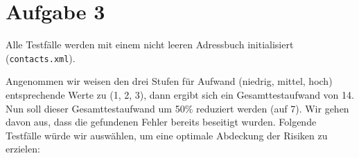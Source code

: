 \section{Aufgabe 3}
Alle Testfälle werden mit einem nicht leeren Adressbuch initialisiert (\texttt{contacts.xml}).

Angenommen wir weisen den drei Stufen für Aufwand (niedrig, mittel, hoch) entsprechende Werte zu (1, 2, 3), dann ergibt sich ein Gesamttestaufwand von 14. Nun soll dieser Gesamttestaufwand um 50\% reduziert werden (auf 7). Wir gehen davon aus, dass die gefundenen Fehler bereits beseitigt wurden. Folgende Testfälle würde wir auswählen, um eine optimale Abdeckung der Risiken zu erzielen:

